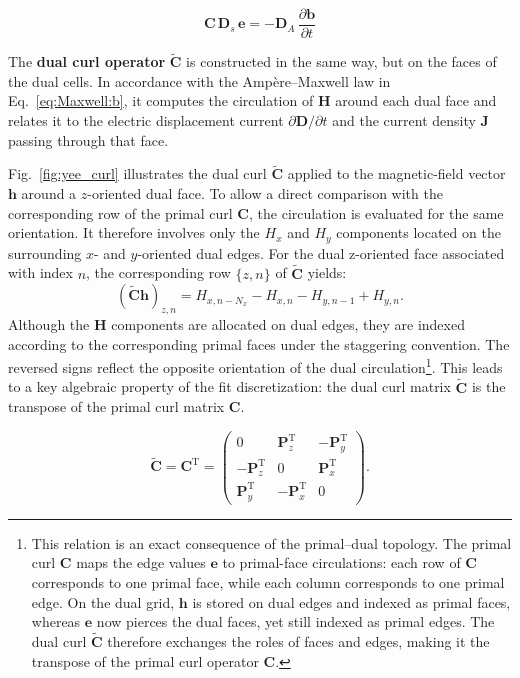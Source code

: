 \begin{equation}
\boxed{
\mathbf{C}\,\mathbf{D}_s\,\mathbf{e}
=-\mathbf{D}_A\,\frac{\partial\mathbf{b}}{\partial t} }
\label{eq:MGE:faraday_final}
\end{equation}

The \textbf{dual curl operator} $\widetilde{\mathbf{C}}$ is constructed in the same way, but on the faces of the dual cells. In accordance with the Amp\`ere--Maxwell law in Eq.~\eqref{eq:Maxwell:b}, it computes the circulation of $\mathbf{H}$ around each dual face and relates it to the electric displacement current $\partial\mathbf{D}/\partial t$ and the current density $\mathbf{J}$ passing through that face.

Fig.~\ref{fig:yee_curl} illustrates the dual curl $\widetilde{\mathbf{C}}$ applied to the magnetic-field vector $\mathbf{h}$ around a $z$-oriented dual face. To allow a direct comparison with the corresponding row of the primal curl $\mathbf{C}$, the circulation is evaluated for the same orientation. It therefore involves only the $H_x$ and $H_y$ components located on the surrounding $x$- and $y$-oriented dual edges. For the dual z-oriented face associated with index $n$, the corresponding row $\{z,n\}$ of $\widetilde{\mathbf{C}}$ yields:
%
\begin{equation}
(\widetilde{\mathbf{C}}\mathbf{h})_{z,n} = H_{x,n-N_x}-H_{x,n} -H_{y,n-1}+H_{y,n}.
\end{equation}
%
Although the $\mathbf{H}$ components are allocated on dual edges, they are indexed according to the corresponding primal faces under the staggering convention. The reversed signs reflect the opposite orientation of the dual circulation\footnote{This relation is an exact consequence of the primal--dual topology. The primal curl $\mathbf{C}$ maps the edge values $\mathbf{e}$ to primal-face circulations: each row of $\mathbf{C}$ corresponds to one primal face, while each column corresponds to one primal edge. On the dual grid, $\mathbf{h}$ is stored on dual edges and indexed as primal faces, whereas $\mathbf{e}$ now pierces the dual faces, yet still indexed as primal edges. The dual curl $\widetilde{\mathbf{C}}$ therefore exchanges the roles of faces and edges, making it the transpose of the primal curl operator $\mathbf{C}$.}. This leads to a key algebraic property of the \gls{fit} discretization: the dual curl matrix $\widetilde{\mathbf{C}}$ is the transpose of the primal curl matrix
$\mathbf{C}$.

\begin{equation}
\widetilde{\mathbf{C}}
=
\mathbf{C}^{\mathrm{T}}
=
\begin{pmatrix}
0 & \mathbf{P}_z^{\mathrm{T}} & -\mathbf{P}_y^{\mathrm{T}} \\ -\mathbf{P}_z^{\mathrm{T}} & 0 & \mathbf{P}_x^{\mathrm{T}} \\
\mathbf{P}_y^{\mathrm{T}} & -\mathbf{P}_x^{\mathrm{T}} & 0
\end{pmatrix}.
\label{eq:C_dual_matrix}
\end{equation}

